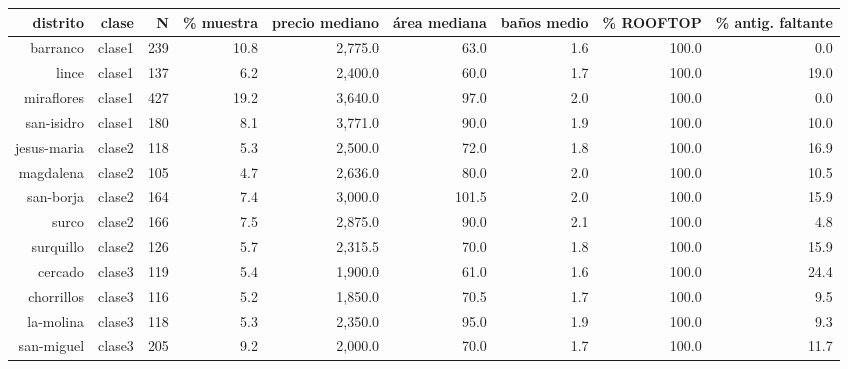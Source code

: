 \begin{tabular}{rrrrrrrrr}
\toprule
distrito & clase & N & \% muestra & precio mediano & área mediana & baños medio & \% ROOFTOP & \% antig. faltante \\
\midrule
barranco & clase1 & 239 & 10.8 & 2,775.0 & 63.0 & 1.6 & 100.0 & 0.0 \\
lince & clase1 & 137 & 6.2 & 2,400.0 & 60.0 & 1.7 & 100.0 & 19.0 \\
miraflores & clase1 & 427 & 19.2 & 3,640.0 & 97.0 & 2.0 & 100.0 & 0.0 \\
san-isidro & clase1 & 180 & 8.1 & 3,771.0 & 90.0 & 1.9 & 100.0 & 10.0 \\
jesus-maria & clase2 & 118 & 5.3 & 2,500.0 & 72.0 & 1.8 & 100.0 & 16.9 \\
magdalena & clase2 & 105 & 4.7 & 2,636.0 & 80.0 & 2.0 & 100.0 & 10.5 \\
san-borja & clase2 & 164 & 7.4 & 3,000.0 & 101.5 & 2.0 & 100.0 & 15.9 \\
surco & clase2 & 166 & 7.5 & 2,875.0 & 90.0 & 2.1 & 100.0 & 4.8 \\
surquillo & clase2 & 126 & 5.7 & 2,315.5 & 70.0 & 1.8 & 100.0 & 15.9 \\
cercado & clase3 & 119 & 5.4 & 1,900.0 & 61.0 & 1.6 & 100.0 & 24.4 \\
chorrillos & clase3 & 116 & 5.2 & 1,850.0 & 70.5 & 1.7 & 100.0 & 9.5 \\
la-molina & clase3 & 118 & 5.3 & 2,350.0 & 95.0 & 1.9 & 100.0 & 9.3 \\
san-miguel & clase3 & 205 & 9.2 & 2,000.0 & 70.0 & 1.7 & 100.0 & 11.7 \\
\bottomrule
\end{tabular}